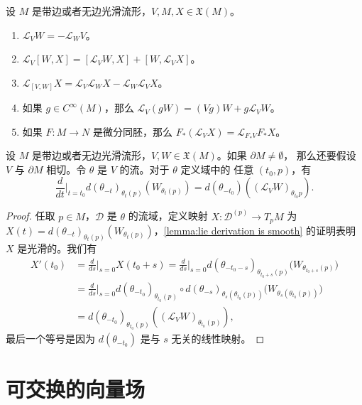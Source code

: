\begin{corollary}
  设 $M$ 是带边或者无边光滑流形，$V,M,X\in\mathfrak X(M)$。
  \begin{enumerate}
    \item $\mathcal L_VW=-\mathcal L_WV$。
    \item $\mathcal L_V[W,X]=[\mathcal L_VW,X]+[W,\mathcal L_VX]$。
    \item $\mathcal L_{[V,W]}X=\mathcal L_V\mathcal L_WX-\mathcal L_W\mathcal L_VX$。
    \item 如果 $g\in C^\infty(M)$，那么 $\mathcal L_V(gW)=(Vg)W+g\mathcal L_VW$。
    \item 如果 $F:M\to N$ 是微分同胚，那么 $F_*(\mathcal L_VX)=\mathcal L_{F_*V}F_*X$。
  \end{enumerate}
\end{corollary}

\begin{proposition}\label{prop:derivation of theta-t}
  设 $M$ 是带边或者无边光滑流形，$V,W\in\mathfrak X(M)$。如果 $\partial M\neq\emptyset$，
  那么还要假设 $V$ 与 $\partial M$ 相切。令 $\theta$ 是 $V$ 的流。对于 $\theta$ 定义域中的
  任意 $(t_0,p)$，有
  \begin{equation}
    \frac{d}{dt}\bigg|_{t=t_0}d(\theta_{-t})_{\theta_t(p)}(W_{\theta_t(p)})
    =d(\theta_{-t_0})\left((\mathcal L_VW)_{\theta_{t_0}p}\right).
  \end{equation}
\end{proposition}
\begin{proof}
  任取 $p\in M$，$\mathcal D$ 是 $\theta$ 的流域，定义映射 $X:\mathcal D^{(p)}\to T_pM$ 为 
  $X(t)=d(\theta_{-t})_{\theta_t(p)}(W_{\theta_t(p)})$，\autoref{lemma:lie derivation is smooth}
  的证明表明 $X$ 是光滑的。我们有
  \begin{align*}
    X'(t_0)&=\frac{d}{ds}\bigg|_{s=0}X(t_0+s)=\frac{d}{ds}\bigg|_{s=0}
    d(\theta_{-t_0-s})_{\theta_{t_0+s}(p)}\bigl(W_{\theta_{t_0+s}(p)}\bigr)\\
    &=\frac{d}{ds}\bigg|_{s=0}
    d(\theta_{-t_0})_{\theta_{t_0}(p)}\circ d(\theta_{-s})_{\theta_s(\theta_{t_0}(p))}\bigl(W_{\theta_s(\theta_{t_0}(p))}\bigr)\\
    &=d(\theta_{-t_0})_{\theta_{t_0}(p)}\left((\mathcal L_VW)_{\theta_{t_0}(p)}\right),
  \end{align*}
  最后一个等号是因为 $d(\theta_{-t_0})$ 是与 $s$ 无关的线性映射。
\end{proof}

\section{可交换的向量场}

